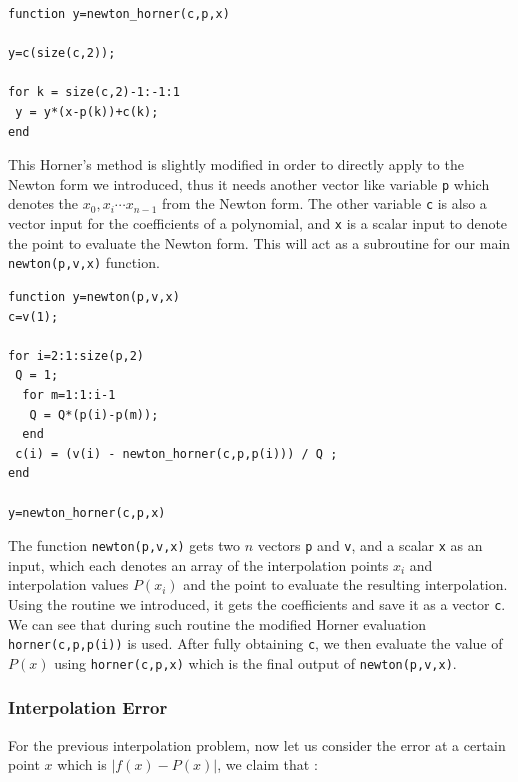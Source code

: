 \documentclass[paper=a4, fontsize=11pt]{scrartcl}
\begin{document}
\begin{lstlisting}[caption='newton\_horner.m']
function y=newton_horner(c,p,x) 

y=c(size(c,2)); 

for k = size(c,2)-1:-1:1 
 y = y*(x-p(k))+c(k);
end
\end{lstlisting}
\vspace{0.15in}

This Horner's method is slightly modified in order to directly apply to the Newton form we introduced, thus it needs another vector like variable \texttt{p} which denotes the $x_0,x_i \cdots x_{n-1}$ from the Newton form. The other variable \texttt{c} is also a vector input for the coefficients of a polynomial, and \texttt{x} is a scalar input to denote the point to evaluate the Newton form. This will act as a subroutine for our main \texttt{newton(p,v,x)} function. \\

\begin{lstlisting}[caption = 'newton.m']
function y=newton(p,v,x)
c=v(1);

for i=2:1:size(p,2)
 Q = 1;
  for m=1:1:i-1
   Q = Q*(p(i)-p(m));
  end
 c(i) = (v(i) - newton_horner(c,p,p(i))) / Q ;
end

y=newton_horner(c,p,x)
\end{lstlisting}
\vspace{0.15in}

The function \texttt{newton(p,v,x)} gets two $n$ vectors \texttt{p} and \texttt{v}, and a scalar \texttt{x} as an input, which each denotes an array of the interpolation points $x_i$ and interpolation values $P(x_i)$ and the point to evaluate the resulting interpolation. Using the routine we introduced, it gets the coefficients and save it as a vector \texttt{c}. We can see that during such routine the modified Horner evaluation \texttt{horner(c,p,p(i))} is used. After fully obtaining \texttt{c}, we then evaluate the value of $P(x)$ using \texttt{horner(c,p,x)} which is the final output of \texttt{newton(p,v,x)}. 

\vspace{0.15in}
\subsubsection{Interpolation Error}
\vspace{0.15in}

For the previous interpolation problem, now let us consider the error at a certain point $x$ which is $|f(x)-P(x)|$, we claim that : \\
\end{document}
